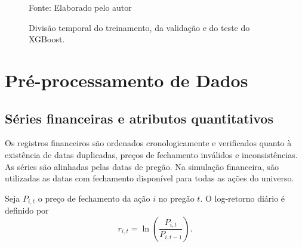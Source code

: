 \begin{figure}[htbp]
    \centering
    \caption{Divisão temporal do treinamento, da validação
    e do teste do XGBoost.}
    \label{fig:divisao_temporal}


    \par\smallskip
    Fonte: Elaborado pelo autor
\end{figure}

\section{Pré-processamento de Dados}
\label{sec:pre_processamento}

\subsection{Séries financeiras e atributos quantitativos}

Os registros financeiros são ordenados cronologicamente
e verificados quanto à existência de datas duplicadas,
preços de fechamento inválidos e inconsistências.
As séries são alinhadas pelas datas de pregão. Na
simulação financeira, são utilizadas as datas com
fechamento disponível para todas as ações do universo.

Seja $P_{i,t}$ o preço de fechamento da ação $i$ no
pregão $t$. O log-retorno diário é definido por
\begin{equation}
r_{i,t}
=
\ln\left(\frac{P_{i,t}}{P_{i,t-1}}\right).
\label{eq:retornos_cap4}
\end{equation}

